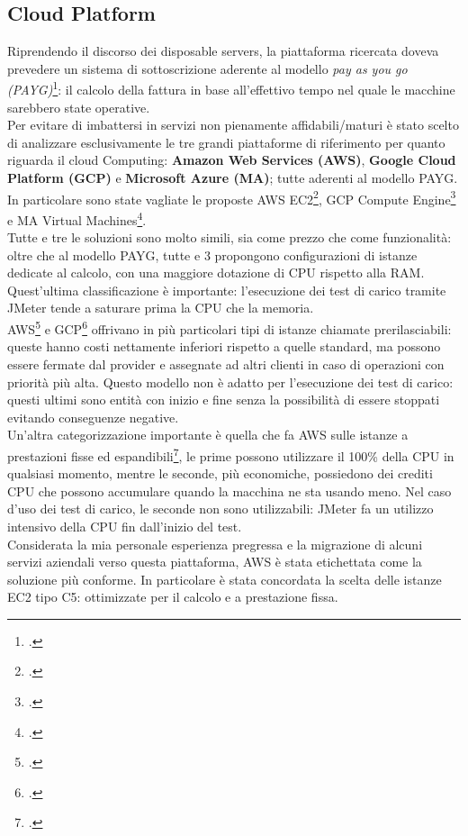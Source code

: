 \subsection{Cloud Platform}
Riprendendo il discorso dei disposable servers, la piattaforma ricercata doveva prevedere un sistema di sottoscrizione aderente al modello \textit{pay as you go (PAYG)}\footcite{article:payg}: il calcolo della fattura in base all'effettivo tempo nel quale le macchine sarebbero state operative. \\
Per evitare di imbattersi in servizi non pienamente affidabili/maturi è stato scelto di analizzare esclusivamente le tre grandi piattaforme di riferimento per quanto riguarda il \gls{cloud} Computing: \textbf{Amazon Web Services (AWS)}, \textbf{Google Cloud Platform (GCP)} e \textbf{Microsoft Azure (MA)}; tutte aderenti al modello PAYG. In particolare sono state vagliate le proposte AWS EC2\footcite{site:ec2}, GCP Compute Engine\footcite{site:gcpce} e MA Virtual Machines\footcite{site:mavm}. \\
Tutte e tre le soluzioni sono molto simili, sia come prezzo che come funzionalità: oltre che al modello PAYG, tutte e 3 propongono configurazioni di istanze dedicate al calcolo, con una maggiore dotazione di CPU rispetto alla RAM. Quest'ultima classificazione è importante: l'esecuzione dei test di carico tramite JMeter tende a saturare prima la CPU che la memoria.\\
AWS\footcite{article:awspre} e GCP\footcite{article:gcppre} offrivano in più particolari tipi di istanze chiamate prerilasciabili: queste hanno costi nettamente inferiori rispetto a quelle standard, ma possono essere fermate dal provider e assegnate ad altri clienti in caso di operazioni con priorità più alta. Questo modello non è adatto per l'esecuzione dei test di carico: questi ultimi sono entità con inizio e fine senza la possibilità di essere stoppati evitando conseguenze negative. \\
Un'altra categorizzazione importante è quella che fa AWS sulle istanze a prestazioni fisse ed espandibili\footcite{article:awsesp}, le prime possono utilizzare il 100\% della CPU in qualsiasi momento, mentre le seconde, più economiche, possiedono dei crediti CPU che possono accumulare quando la macchina ne sta usando meno. Nel caso d'uso dei test di carico, le seconde non sono utilizzabili: JMeter fa un utilizzo intensivo della CPU fin dall'inizio del test.\\ 
Considerata la mia personale esperienza pregressa e la migrazione di alcuni servizi aziendali verso questa piattaforma, AWS è stata etichettata come la soluzione più conforme. In particolare è stata concordata la scelta delle istanze EC2 tipo C5: ottimizzate per il calcolo e a prestazione fissa.
